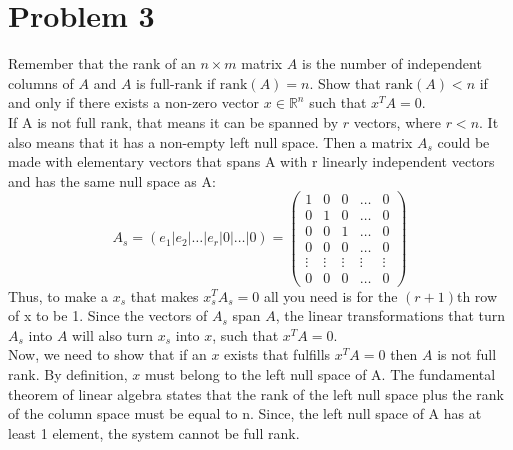 \documentclass{article}
\newcommand{\rank}{\text{rank}}
\begin{document}
\section*{Problem 3}
Remember that the rank of an $n\times m$ matrix $A$ is the number of independent columns of $A$ and $A$ is full-rank if $\rank(A)=n$. Show that $\rank(A)<n$ if and only if there exists a non-zero vector $x\in\mathbb{R}^n$ such that $x^TA=0$.\\
If A is not full rank, that means it can be spanned by $r$ vectors, where $r<n$. It also means that it has a non-empty left null space.  Then a matrix $A_s$ could be made with elementary vectors that spans A with r linearly independent vectors and has the same null space as A:
\[A_s=\left (e_1\bigg|e_2\bigg|\dots\bigg|e_r\bigg|0\bigg|\dots\bigg|0\right )=\begin{pmatrix}1&0&0&\dots&0\\0&1&0&\dots&0\\0&0&1&\dots&0\\0&0&0&\dots&0\\\vdots&\vdots&\vdots&\vdots&\vdots\\0&0&0&\dots&0\end{pmatrix}\]
Thus, to make a $x_s$ that makes $x_s^TA_s=0$ all you need is for the $(r+1)$th row of x to be 1. Since the vectors of $A_s$ span $A$, the linear transformations that turn $A_s$ into $A$ will also turn $x_s$ into $x$, such that $x^TA=0$.\\

Now, we need to show that if an $x$ exists that fulfills $x^TA=0$ then $A$ is not full rank. By definition, $x$ must belong to the left null space of A. The fundamental theorem of linear algebra states that the rank of the left null space plus the rank of the column space must be equal to n. Since, the left null space of A has at least 1 element, the system cannot be full rank.
\end{document}
